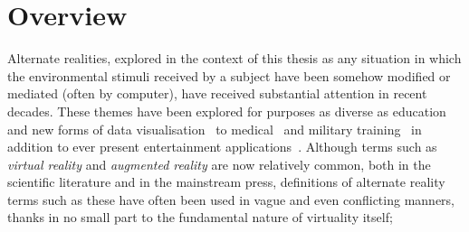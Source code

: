


\section{Overview}

Alternate realities, explored in the context of this thesis as any situation in which the environmental stimuli received by a subject have been somehow modified or mediated (often by computer), have received substantial attention in recent decades. These themes have been explored for purposes as diverse as education~\cite{Warburton2009} and new forms of data visualisation~\cite{Coleman2009} to medical~\cite{TenEyck2011} and military training~\cite{Qiu2009} in addition to ever present entertainment applications~\cite{Scherrer2008}. Although terms such as \textit{virtual reality} and \textit{augmented reality} are now relatively common, both in the scientific literature and in the mainstream press, definitions of alternate reality terms such as these have often been used in vague and even conflicting manners, thanks in no small part to the fundamental nature of virtuality itself;

